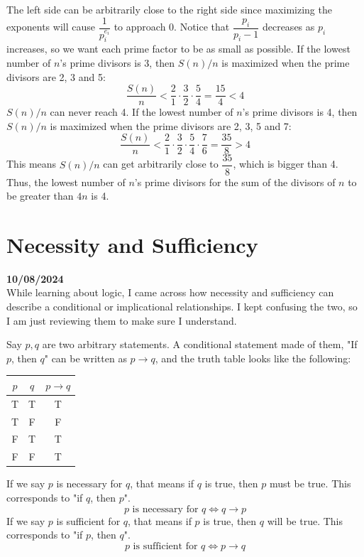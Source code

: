 \documentclass[12pt, oneside]{article}
\begin{document}
The left side can be arbitrarily close to the right side since maximizing the exponents will cause $\dfrac{1}{p_i^{e_i}}$ to approach 0. Notice that $\dfrac{p_i}{p_i-1}$ decreases as $p_i$ increases, so we want each prime factor to be as small as possible. If the lowest number of $n$'s prime divisors is 3, then $S(n)/n$ is maximized when the prime divisors are 2, 3 and 5:
\[
\frac{S(n)}{n} < \frac{2}{1} \cdot \frac{3}{2} \cdot \frac{5}{4} = \frac{15}{4} < 4
\]
$S(n)/n$ can never reach 4. If the lowest number of $n$'s prime divisors is 4, then $S(n)/n$ is maximized when the prime divisors are 2, 3, 5 and 7:
\[
\frac{S(n)}{n} < \frac{2}{1} \cdot \frac{3}{2} \cdot \frac{5}{4} \cdot \frac{7}{6} = \frac{35}{8} > 4
\]
This means $S(n)/n$ can get arbitrarily close to $\dfrac{35}{8}$, which is bigger than 4. Thus, the lowest number of $n$'s prime divisors for the sum of the divisors of $n$ to be greater than $4n$ is 4.
\section*{Necessity and Sufficiency}
\textbf{10/08/2024}\\
While learning about logic, I came across how necessity and sufficiency can describe a conditional or implicational relationships. I kept confusing the two, so I am just reviewing them to make sure I understand.

Say $p, q$ are two arbitrary statements. A conditional statement made of them, "If $p$, then $q$" can be written as $p \rightarrow q$, and the truth table looks like the following:
\begin{center}
\begin{tabular}{|c|c|c|}
\hline
$p$ & $q$ & $p \rightarrow q$\\
\hline
T & T & T\\
\hline
T & F & F\\
\hline
F & T & T\\
\hline
F & F & T\\
\hline
\end{tabular}
\end{center}
If we say $p$ is necessary for $q$, that means if $q$ is true, then $p$ must be true. This corresponds to "if $q$, then $p$".
\[ p \text{ is necessary for } q \Leftrightarrow q \rightarrow p\]
If we say $p$ is sufficient for $q$, that means if $p$ is true, then $q$ will be true. This corresponds to "if $p$, then $q$".
\[ p \text{ is sufficient for } q \Leftrightarrow p \rightarrow q\]
\end{document}

